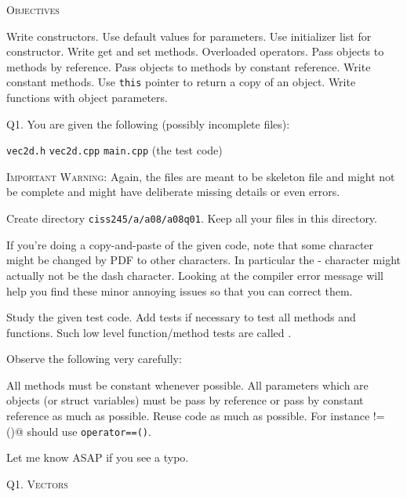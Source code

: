 


\topmatter

\textsc{Objectives}
\begin{tightlist}
  \li Write constructors. 
  \li Use default values for parameters. 
  \li Use initializer list for constructor. 
  \li Write get and set methods. 
  \li Overloaded operators. 
  \li Pass objects to methods by reference. 
  \li Pass objects to methods by constant reference.
  \li Write constant methods. 
  \li Use \texttt{this} pointer to return a copy of an object. 
  \li Write functions with object parameters.
\end{tightlist}


\newpage
Q1.
You are given the following (possibly incomplete files):
\begin{tightlist}
  \li \texttt{vec2d.h}
  \li \texttt{vec2d.cpp}
  \li \texttt{main.cpp} (the test code)
\end{tightlist}
\textsc{Important Warning:}
Again, the files are meant to be skeleton file and might not be
complete and might have deliberate missing details or even errors.

Create directory
\texttt{ciss245/a/a08/a08q01}.
Keep all your files in this directory.

If you're doing a copy-and-paste of the given code,
note that some character might be changed by PDF to other characters.
In particular the - character might actually not be the dash character.
Looking at the compiler error message will help you find these minor
annoying issues so that you can correct them.

Study the given test code.
Add tests if necessary to test all methods and functions.
Such low level function/method tests are called .

Observe the following very carefully:
\begin{tightlist}
\li All methods must be constant whenever possible. 
\li All parameters which are objects (or struct variables)
must be pass by reference or pass by constant reference as much as possible.
\li Reuse code as much as possible.
For instance \verb@operator!=()@ should use \verb!operator==()!. 
\end{tightlist}

Let me know ASAP if you see a typo.

\newpage
Q1. \textsc{Vectors}

